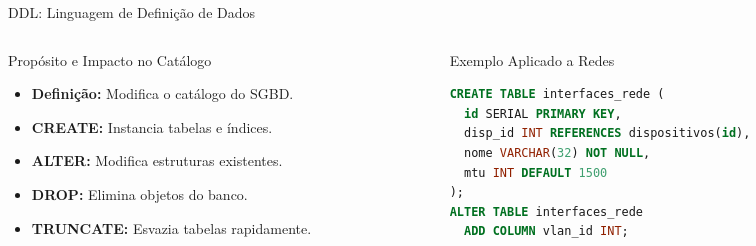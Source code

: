 \begin{frame}[fragile]{DDL: Linguagem de Definição de Dados}
  \vspace{-0.3cm}
  \begin{columns}[t]
    \begin{column}{0.48\textwidth}
      \alert{Propósito e Impacto no Catálogo}\par
      \vspace{0.05cm}
      \begin{itemize}\setlength{\itemsep}{0pt}\setlength{\parskip}{0pt}
        \item \textbf{Definição:} Modifica o catálogo do SGBD.
        \item \textbf{CREATE:} Instancia tabelas e índices.
        \item \textbf{ALTER:} Modifica estruturas existentes.
        \item \textbf{DROP:} Elimina objetos do banco.
        \item \textbf{TRUNCATE:} Esvazia tabelas rapidamente.
      \end{itemize}
    \end{column}

    \begin{column}{0.48\textwidth}
      \alert{Exemplo Aplicado a Redes}\par
      \vspace{0.05cm}
\begin{lstlisting}[language=SQL,basicstyle=\ttfamily\tiny]
CREATE TABLE interfaces_rede (
  id SERIAL PRIMARY KEY,
  disp_id INT REFERENCES dispositivos(id),
  nome VARCHAR(32) NOT NULL,
  mtu INT DEFAULT 1500
);
ALTER TABLE interfaces_rede 
  ADD COLUMN vlan_id INT;
\end{lstlisting}
    \end{column}
  \end{columns}
\end{frame}


